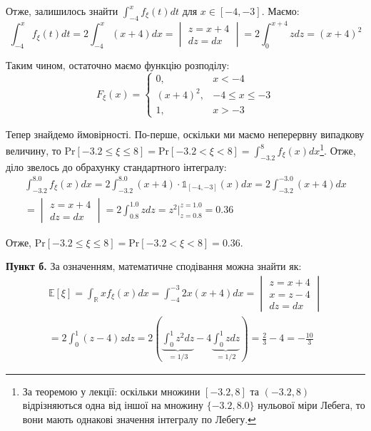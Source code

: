 \documentclass[oneside,solution]{karazin-prob-theory-assign}
\begin{document}
Отже, залишилось знайти $\int_{-4}^x f_{\xi}(t)dt$ для $x \in [-4,-3]$. Маємо:
\begin{equation}
    \int_{-4}^x f_{\xi}(t)dt = 2\int_{-4}^x (x+4)dx = \begin{vmatrix}
        z = x+4 \\
        dz = dx
    \end{vmatrix} = 2\int_0^{x+4}zdz = (x+4)^2
\end{equation}

Таким чином, остаточно маємо функцію розподілу:
\begin{equation}
    \boxed{F_{\xi}(x) = \begin{cases}
        0, & x < -4 \\
        (x+4)^2, & -4 \leq x \leq -3 \\
        1, & x > -3
    \end{cases}}
\end{equation}

Тепер знайдемо ймовірності. По-перше, оскільки ми маємо неперервну випадкову величину, то $\text{Pr}[-3.2 \leq \xi \leq 8] = \text{Pr}[-3.2 < \xi < 8] = \int_{-3.2}^8 f_{\xi}(x)dx$\footnote{За теоремою у лекції: оскільки множини $[-3.2,8]$ та $(-3.2,8)$ відрізняються одна від іншої на множину $\{-3.2,8.0\}$ нульової міри Лебега, то вони мають однакові значення інтегралу по Лебегу.}. Отже, діло звелось до обрахунку стандартного інтегралу:
\begin{gather}
    \int_{-3.2}^{8.0} f_{\xi}(x)dx = 2\int_{-3.2}^{8.0} (x+4) \cdot \mathds{1}_{[-4,-3]}(x)dx = 2\int_{-3.2}^{-3.0}(x+4)dx \nonumber \\
    = \begin{vmatrix}
        z = x + 4 \\
        dz = dx
    \end{vmatrix} = 2\int_{0.8}^{1.0} zdz = z^2\Big|_{z=0.8}^{z=1.0} = 0.36
\end{gather}

Отже, $\boxed{\text{Pr}[-3.2 \leq \xi \leq 8] = \text{Pr}[-3.2 < \xi < 8] = 0.36}$.

\textbf{Пункт б.} За означенням, математичне сподівання можна знайти як:
\begin{gather}
    \mathbb{E}[\xi] = \int_{\mathbb{R}}xf_{\xi}(x)dx = \int_{-4}^{-3} 2x(x+4)dx = \begin{vmatrix}
        z = x + 4 \\
        x = z-4 \\
        dz = dx
    \end{vmatrix} \nonumber \\
    = 2\int_0^1 (z-4)zdz = 2\left(\underbrace{\int_0^1 z^2dz}_{=1/3} - 4\underbrace{\int_0^1 zdz}_{=1/2}\right) = \frac{2}{3} - 4 = \boxed{-\frac{10}{3}}
\end{gather}
\end{document}
